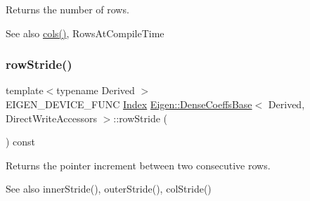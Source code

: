 \begin{DoxyReturn}{Returns}
the number of rows. 
\end{DoxyReturn}
\begin{DoxySeeAlso}{See also}
\mbox{\hyperlink{struct_eigen_1_1_eigen_base_a7b0b45c7351847696c911ce8aa2abbdb}{cols()}}, Rows\+At\+Compile\+Time 
\end{DoxySeeAlso}
\mbox{\label{class_eigen_1_1_dense_coeffs_base_3_01_derived_00_01_direct_write_accessors_01_4_a922802af1c7db5993a8af2fb7634592f}} 
\subsubsection{\texorpdfstring{rowStride()}{rowStride()}}
{\footnotesize\ttfamily template$<$typename Derived $>$ \\
E\+I\+G\+E\+N\+\_\+\+D\+E\+V\+I\+C\+E\+\_\+\+F\+U\+NC \mbox{\hyperlink{struct_eigen_1_1_eigen_base_a554f30542cc2316add4b1ea0a492ff02}{Index}} \mbox{\hyperlink{class_eigen_1_1_dense_coeffs_base}{Eigen\+::\+Dense\+Coeffs\+Base}}$<$ Derived, Direct\+Write\+Accessors $>$\+::row\+Stride (\begin{DoxyParamCaption}{ }\end{DoxyParamCaption}) const\hspace{0.3cm}{\ttfamily [inline]}}

\begin{DoxyReturn}{Returns}
the pointer increment between two consecutive rows.
\end{DoxyReturn}
\begin{DoxySeeAlso}{See also}
inner\+Stride(), outer\+Stride(), col\+Stride() 
\end{DoxySeeAlso}
\mbox{\label{class_eigen_1_1_dense_coeffs_base_3_01_derived_00_01_direct_write_accessors_01_4_ac2c9348df3bb9c0044dbae6c278a8977}} 
